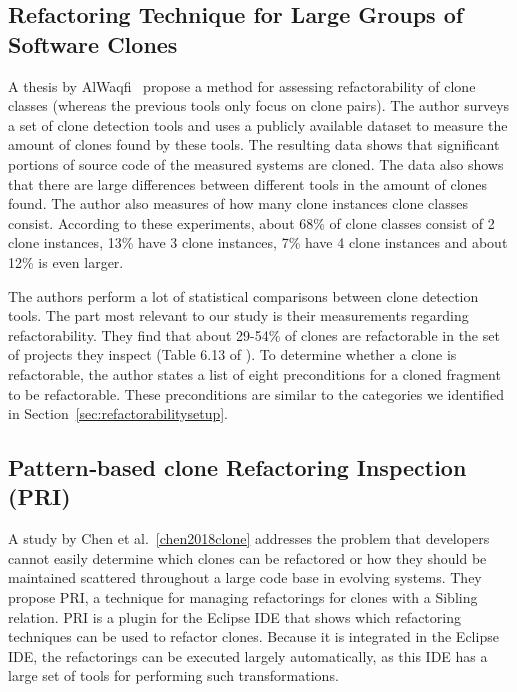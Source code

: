 \subsection{Refactoring Technique for Large Groups of Software Clones}
A thesis by AlWaqfi~\cite{alwaqfi2017refactoring} propose a method for assessing refactorability of clone classes (whereas the previous tools only focus on clone pairs). The author surveys a set of clone detection tools \cite{kamiya2002ccfinder, baxter1999clonedr, jiang2007deckard, cordy2011nicad} and uses a publicly available dataset \cite{tsantalis2015assessing} to measure the amount of clones found by these tools. The resulting data shows that significant portions of source code of the measured systems are cloned. The data also shows that there are large differences between different tools in the amount of clones found. The author also measures of how many clone instances clone classes consist. According to these experiments, about 68\% of clone classes consist of 2 clone instances, 13\% have 3 clone instances, 7\% have 4 clone instances and about 12\% is even larger.

The authors perform a lot of statistical comparisons between clone detection tools. The part most relevant to our study is their measurements regarding refactorability. They find that about 29-54\% of clones are refactorable in the set of projects they inspect (Table 6.13 of \cite{alwaqfi2017refactoring}). To determine whether a clone is refactorable, the author states a list of eight preconditions for a cloned fragment to be refactorable. These preconditions are similar to the categories we identified in Section~\ref{sec:refactorabilitysetup}.

\subsection{Pattern‐based clone Refactoring Inspection (PRI)}
A study by Chen et al.~\ref{chen2018clone} addresses the problem that developers cannot easily determine which clones can be refactored or how they should be maintained scattered
throughout a large code base in evolving systems. They propose PRI, a technique for managing refactorings for clones with a Sibling relation. PRI is a plugin for the Eclipse IDE that shows which refactoring techniques can be used to refactor clones. Because it is integrated in the Eclipse IDE, the refactorings can be executed largely automatically, as this IDE has a large set of tools for performing such transformations.

